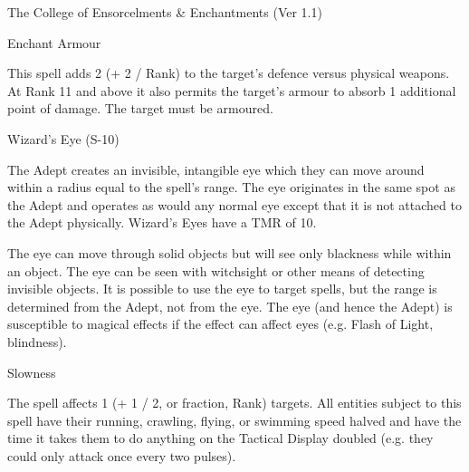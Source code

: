 \begin{Chapter}{The College of Ensorcelments \& Enchantments (Ver 1.1)}
\begin{spell}[S-9]{Enchant Armour }

\begin{effects}
This spell adds 2 (+ 2 / Rank) to the target’s defence versus
physical weapons. At Rank 11 and above it also permits the target’s
armour to absorb 1 additional point of damage.  The target must be
armoured.
\end{effects}
\end{spell}

\begin{spell}[S-10]{Wizard’s Eye (S-10)}
\begin{effects}
The Adept creates an invisible, intangible eye which they can move
around within a radius equal to the spell’s range. The eye originates
in the same spot as the Adept and operates as would any normal eye
except that it is not attached to the Adept physically.  Wizard’s Eyes
have a TMR of 10.

The eye can move through solid objects but will see only blackness
while within an object. The eye can be seen with witchsight or other
means of detecting invisible objects. It is possible to use the eye to
target spells, but the range is determined from the Adept, not from
the eye.  The eye (and hence the Adept) is susceptible to magical
effects if the effect can affect eyes (e.g.  Flash of Light,
blindness).
\end{effects}
\end{spell}

\begin{spell}[S-11]{Slowness }

\begin{effects}
The spell affects 1 (+ 1 / 2, or fraction, Rank) targets. All entities
subject to this spell have their running, crawling, flying, or
swimming speed halved and have the time it takes them to do anything
on the Tactical Display doubled (e.g.  they could only attack once
every two pulses).
\end{effects}
\end{spell}


\end{Chapter}
